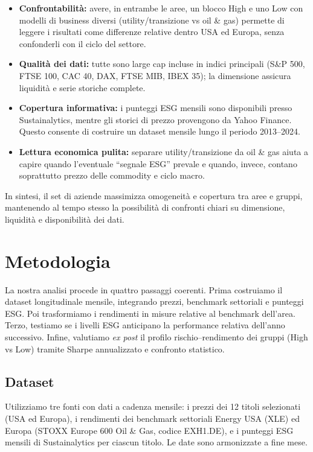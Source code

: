 \documentclass[12pt,a4paper]{article}
\begin{document}
\begin{itemize}
\item \textbf{Confrontabilità:} avere, in entrambe le aree, un blocco High e uno Low con modelli di business diversi (utility/transizione vs oil \& gas) permette di leggere i risultati come differenze relative dentro USA ed Europa, senza confonderli con il ciclo del settore.
\item \textbf{Qualità dei dati:} tutte sono large cap incluse in indici principali (S\&P 500, FTSE 100, CAC 40, DAX, FTSE MIB, IBEX 35); la dimensione assicura liquidità e serie storiche complete.
\item \textbf{Copertura informativa:} i punteggi ESG mensili sono disponibili presso Sustainalytics, mentre gli storici di prezzo provengono da Yahoo Finance. Questo consente di costruire un dataset mensile lungo il periodo 2013--2024.
\item \textbf{Lettura economica pulita:} separare utility/transizione da oil \& gas aiuta a capire quando l'eventuale ``segnale ESG'' prevale e quando, invece, contano soprattutto prezzo delle commodity e ciclo macro.
\end{itemize}

In sintesi, il set di aziende massimizza omogeneità e copertura tra aree e gruppi, mantenendo al tempo stesso la possibilità di confronti chiari su dimensione, liquidità e disponibilità dei dati.

\section{Metodologia}

La nostra analisi procede in quattro passaggi coerenti. Prima costruiamo il dataset longitudinale mensile, integrando prezzi, benchmark settoriali e punteggi ESG. Poi trasformiamo i rendimenti in misure relative al benchmark dell'area. Terzo, testiamo se i livelli ESG anticipano la performance relativa dell'anno successivo. Infine, valutiamo \textit{ex post} il profilo rischio--rendimento dei gruppi (High vs Low) tramite Sharpe annualizzato e confronto statistico.

\subsection{Dataset}

Utilizziamo tre fonti con dati a cadenza mensile: i prezzi dei 12 titoli selezionati (USA ed Europa), i rendimenti dei benchmark settoriali Energy USA (XLE) ed Europa (STOXX Europe 600 Oil \& Gas, codice EXH1.DE), e i punteggi ESG mensili di Sustainalytics per ciascun titolo. Le date sono armonizzate a fine mese.
\end{document}
